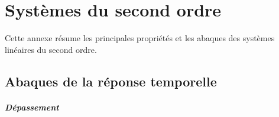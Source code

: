 \chapter{Systèmes du second ordre\label{annexe-2nd}}
Cette annexe résume les principales propriétés et les abaques des 
systèmes linéaires du second ordre.
\newpage
\section{Abaques de la réponse temporelle}

\paragraph{Dépassement}
\begin{figure}[!hbt]
    \centering
    
\end{figure}
